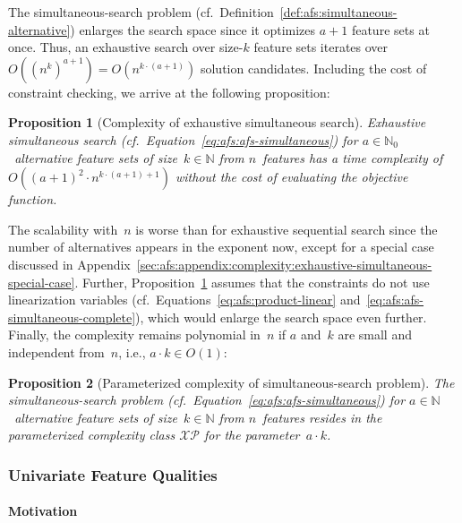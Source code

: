 \documentclass{article}
\newtheorem{proposition}{Proposition}
\theoremstyle{definition}
\begin{document}
The simultaneous-search problem (cf.~Definition~\ref{def:afs:simultaneous-alternative}) enlarges the search space since it optimizes $a+1$ feature sets at once.
Thus, an exhaustive search over size-$k$ feature sets iterates over~$O((n^k)^{a+1}) = O(n^{k \cdot (a+1)})$ solution candidates.
Including the cost of constraint checking, we arrive at the following proposition:
%
\begin{proposition}[Complexity of exhaustive simultaneous search]
	Exhaustive simultaneous search (cf.~Equation~\ref{eq:afs:afs-simultaneous}) for $a \in \mathbb{N}_0$~alternative feature sets of size~$k \in \mathbb{N}$ from $n$~features has a time complexity of~$O((a+1)^2 \cdot n^{k \cdot (a+1) + 1})$ without the cost of evaluating the objective function.
	\label{prop:afs:complexity-exhaustive-simultaneuos}
\end{proposition}
%
The scalability with~$n$ is worse than for exhaustive sequential search since the number of alternatives appears in the exponent now, except for a special case discussed in Appendix~\ref{sec:afs:appendix:complexity:exhaustive-simultaneous-special-case}.
Further, Proposition~\ref{prop:afs:complexity-exhaustive-simultaneuos} assumes that the constraints do not use linearization variables (cf.~Equations~\ref{eq:afs:product-linear} and~\ref{eq:afs:afs-simultaneous-complete}), which would enlarge the search space even further.
Finally, the complexity remains polynomial in~$n$ if $a$ and~$k$ are small and independent from~$n$, i.e., $a \cdot k \in O(1)$:
%
\begin{proposition}[Parameterized complexity of simultaneous-search problem]
	The simultaneous-search problem (cf.~Equation~\ref{eq:afs:afs-simultaneous}) for $a \in \mathbb{N}$~alternative feature sets of size~$k \in \mathbb{N}$ from $n$~features resides in the parameterized complexity class $\mathcal{XP}$ for the parameter~$a \cdot k$.
	\label{prop:afs:complexity-simultaneuos-xp}
\end{proposition}

\subsubsection{Univariate Feature Qualities}
\label{sec:afs:approach:complexity:univariate}

\paragraph{Motivation}
\end{document}
